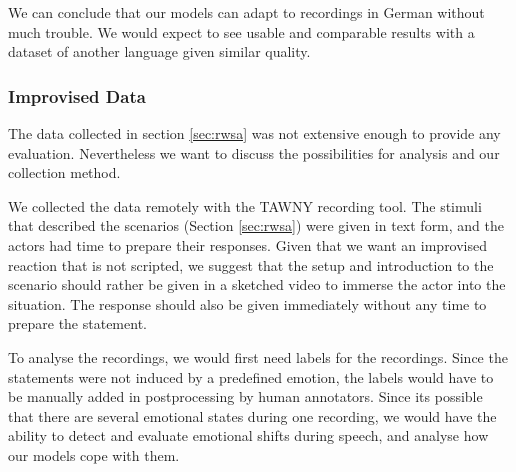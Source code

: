 We can conclude that our models can adapt to recordings in German without much trouble. We would expect to see usable and comparable results with a dataset of another language given similar quality.

\subsubsection{Improvised Data}
The data collected in section \ref{sec:rwsa} was not extensive enough to provide any evaluation. Nevertheless we want to discuss the possibilities for analysis and our collection method.

We collected the data remotely with the TAWNY recording tool. The stimuli that described the scenarios (Section \ref{sec:rwsa}) were given in text form, and the actors had time to prepare their responses. Given that we want an improvised reaction that is not scripted, we suggest that the setup and introduction to the scenario should rather be given in a sketched video to immerse the actor into the situation. The response should also be given immediately without any time to prepare the statement.

To analyse the recordings, we would first need labels for the recordings. Since the statements were not induced by a predefined emotion, the labels would have to be manually added in postprocessing by human annotators. Since its possible that there are several emotional states during one recording, we would have the ability to detect and evaluate emotional shifts during speech, and analyse how our models cope with them. 